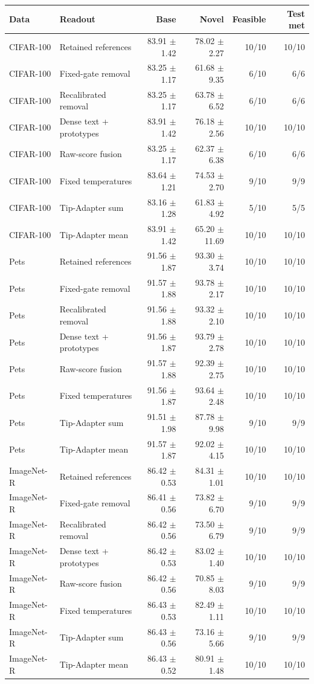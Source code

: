 \begin{tabular}{llrrrr}
\toprule
Data & Readout & Base & Novel & Feasible & Test met \\
\midrule
CIFAR-100 & Retained references & 83.91 $\pm$ 1.42 & 78.02 $\pm$ 2.27 & 10/10 & 10/10 \\
CIFAR-100 & Fixed-gate removal & 83.25 $\pm$ 1.17 & 61.68 $\pm$ 9.35 & 6/10 & 6/6 \\
CIFAR-100 & Recalibrated removal & 83.25 $\pm$ 1.17 & 63.78 $\pm$ 6.52 & 6/10 & 6/6 \\
CIFAR-100 & Dense text + prototypes & 83.91 $\pm$ 1.42 & 76.18 $\pm$ 2.56 & 10/10 & 10/10 \\
CIFAR-100 & Raw-score fusion & 83.25 $\pm$ 1.17 & 62.37 $\pm$ 6.38 & 6/10 & 6/6 \\
CIFAR-100 & Fixed temperatures & 83.64 $\pm$ 1.21 & 74.53 $\pm$ 2.70 & 9/10 & 9/9 \\
CIFAR-100 & Tip-Adapter sum & 83.16 $\pm$ 1.28 & 61.83 $\pm$ 4.92 & 5/10 & 5/5 \\
CIFAR-100 & Tip-Adapter mean & 83.91 $\pm$ 1.42 & 65.20 $\pm$ 11.69 & 10/10 & 10/10 \\
\midrule
Pets & Retained references & 91.56 $\pm$ 1.87 & 93.30 $\pm$ 3.74 & 10/10 & 10/10 \\
Pets & Fixed-gate removal & 91.57 $\pm$ 1.88 & 93.78 $\pm$ 2.17 & 10/10 & 10/10 \\
Pets & Recalibrated removal & 91.56 $\pm$ 1.88 & 93.32 $\pm$ 2.10 & 10/10 & 10/10 \\
Pets & Dense text + prototypes & 91.56 $\pm$ 1.87 & 93.79 $\pm$ 2.78 & 10/10 & 10/10 \\
Pets & Raw-score fusion & 91.57 $\pm$ 1.88 & 92.39 $\pm$ 2.75 & 10/10 & 10/10 \\
Pets & Fixed temperatures & 91.56 $\pm$ 1.87 & 93.64 $\pm$ 2.48 & 10/10 & 10/10 \\
Pets & Tip-Adapter sum & 91.51 $\pm$ 1.98 & 87.78 $\pm$ 9.98 & 9/10 & 9/9 \\
Pets & Tip-Adapter mean & 91.57 $\pm$ 1.87 & 92.02 $\pm$ 4.15 & 10/10 & 10/10 \\
\midrule
ImageNet-R & Retained references & 86.42 $\pm$ 0.53 & 84.31 $\pm$ 1.01 & 10/10 & 10/10 \\
ImageNet-R & Fixed-gate removal & 86.41 $\pm$ 0.56 & 73.82 $\pm$ 6.70 & 9/10 & 9/9 \\
ImageNet-R & Recalibrated removal & 86.42 $\pm$ 0.56 & 73.50 $\pm$ 6.79 & 9/10 & 9/9 \\
ImageNet-R & Dense text + prototypes & 86.42 $\pm$ 0.53 & 83.02 $\pm$ 1.40 & 10/10 & 10/10 \\
ImageNet-R & Raw-score fusion & 86.42 $\pm$ 0.56 & 70.85 $\pm$ 8.03 & 9/10 & 9/9 \\
ImageNet-R & Fixed temperatures & 86.43 $\pm$ 0.53 & 82.49 $\pm$ 1.11 & 10/10 & 10/10 \\
ImageNet-R & Tip-Adapter sum & 86.43 $\pm$ 0.56 & 73.16 $\pm$ 5.66 & 9/10 & 9/9 \\
ImageNet-R & Tip-Adapter mean & 86.43 $\pm$ 0.52 & 80.91 $\pm$ 1.48 & 10/10 & 10/10 \\
\bottomrule
\end{tabular}
